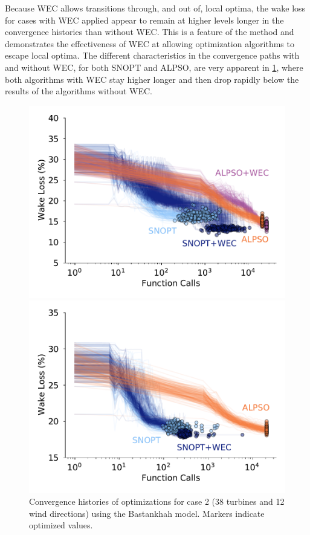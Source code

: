 \documentclass{jpconf}
\begin{document}
Because WEC allows transitions through, and out of, local optima, the wake loss for cases with WEC applied appear to remain at higher levels longer in the convergence histories than without WEC. This is a feature of the method and demonstrates the effectiveness of WEC at allowing optimization algorithms to escape local optima. The different characteristics in the convergence paths with and without WEC, for both SNOPT and ALPSO, are very apparent in \cref{fig:case-2-histories}, where both algorithms with WEC stay higher longer and then drop rapidly below the results of the algorithms without WEC.

\begin{figure}[h!]
	\centering
	\begin{minipage}[t]{.45\textwidth}
		\centering
		\includegraphics[width=\textwidth]{final_images/results/convergence_history_BPAmodel_38turbs_12dirs}  
		\caption{Convergence histories of optimizations for case 2 (38 turbines and 12 wind directions) using the Bastankhah model. Markers indicate optimized values.}
		\label{fig:case-2-histories}
	\end{minipage}\hspace{1pc}
	\begin{minipage}[t]{0.45\textwidth}
		\centering
		\includegraphics[width=\textwidth]{final_images/results/convergence_history_JENSENmodel_38turbs_12dirs}  

\end{minipage}
\end{figure}
\end{document}
